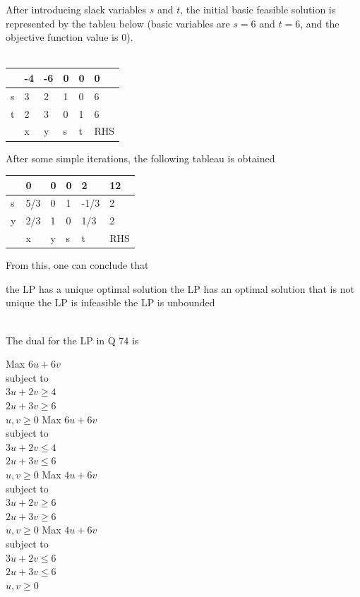 \documentclass[addpoints,11pt]{exam}
\begin{document}
\begin{questions}
    \question After introducing slack variables $s$ and $t$, the initial basic feasible solution is represented by the tableu below (basic variables are $s=6$ and $t=6$, and the objective function value is 0).\\\\
    \begin{center}
        \begin{tabular}{|l|l|l|l|l|l|}
            \hline
            &-4&-6&0&0&0\\\hline
            s&3&2&1&0&6\\\hline
            t&2&3&0&1&6\\\hline
            &x&y&s&t&RHS\\\hline
        \end{tabular}
    \end{center}
    After some simple iterations, the following tableau is obtained
    \begin{center}
        \begin{tabular}{|l|l|l|l|l|l|}
            \hline
            &0&0&0&2&12\\\hline
            s&5/3&0&1&-1/3&2\\\hline
            y&2/3&1&0&1/3&2\\\hline
            &x&y&s&t&RHS\\\hline
        \end{tabular}
    \end{center}
    From this, one can conclude that

    \begin{oneparchoices}
        \choice the LP has a unique optimal solution
        \choice the LP has an optimal solution that is not unique
        \choice the LP is infeasible
        \choice the LP is unbounded
    \end{oneparchoices}\\

    \question The dual for the LP in Q 74 is\\

    \begin{choices}
        \choice Max $6u + 6v$\\
subject to\\
$3u+2v\ge4$\\
$2u+3v\ge6$\\
$u,v\ge0$
        \choice Max $6u + 6v$\\
subject to\\
$3u+2v\le4$\\
$2u+3v\le6$\\
$u,v\ge0$
        \choice Max $4u + 6v$\\
subject to\\
$3u+2v\ge6$\\
$2u+3v\ge6$\\
$u,v\ge0$
        \choice Max $4u + 6v$\\
subject to\\
$3u+2v\le6$\\
$2u+3v\le6$\\
$u,v\ge0$
    \end{choices}


\end{questions}
\end{document}
